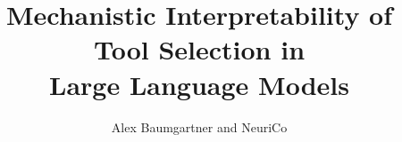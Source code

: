 \documentclass{article}
\title{Mechanistic Interpretability of Tool Selection in\\Large Language Models}
\author{Alex Baumgartner and NeuriCo}
\begin{document}
\maketitle

\begin{abstract}

\end{abstract}











\appendix

\end{document}
